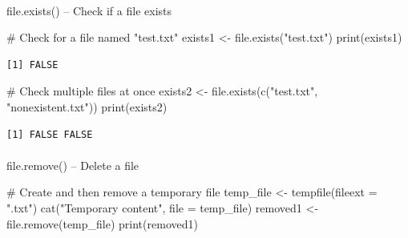 \documentclass[
  letterpaper,
  DIV=11,
  numbers=noendperiod]{scrartcl}
\makeatletter
\let\oldparagraph\paragraph
\renewcommand{\paragraph}{
    \@ifstar
      \xxxParagraphStar
      \xxxParagraphNoStar
  }
\newcommand{\xxxParagraphStar}[1]{\oldparagraph*{#1}\mbox{}}
\newcommand{\xxxParagraphNoStar}[1]{\oldparagraph{#1}\mbox{}}
\newenvironment{Shaded}{\begin{snugshade}}{\end{snugshade}}
\newcommand{\AttributeTok}[1]{\textcolor[rgb]{0.40,0.45,0.13}{#1}}
\newcommand{\CommentTok}[1]{\textcolor[rgb]{0.37,0.37,0.37}{#1}}
\newcommand{\FunctionTok}[1]{\textcolor[rgb]{0.28,0.35,0.67}{#1}}
\newcommand{\NormalTok}[1]{\textcolor[rgb]{0.00,0.23,0.31}{#1}}
\newcommand{\OtherTok}[1]{\textcolor[rgb]{0.00,0.23,0.31}{#1}}
\newcommand{\StringTok}[1]{\textcolor[rgb]{0.13,0.47,0.30}{#1}}
\makeatother
\begin{document}
\paragraph{file.exists() -- Check if a file
exists}\label{fileexists--check-if-a-file-exists}

\begin{Shaded}
\begin{Highlighting}[]
\CommentTok{\#   Check for a file named "test.txt"}
\NormalTok{exists1 }\OtherTok{\textless{}{-}} \FunctionTok{file.exists}\NormalTok{(}\StringTok{"test.txt"}\NormalTok{)}
\FunctionTok{print}\NormalTok{(exists1)}
\end{Highlighting}
\end{Shaded}

\begin{verbatim}
[1] FALSE
\end{verbatim}

\begin{Shaded}
\begin{Highlighting}[]
\CommentTok{\#   Check multiple files at once}
\NormalTok{exists2 }\OtherTok{\textless{}{-}} \FunctionTok{file.exists}\NormalTok{(}\FunctionTok{c}\NormalTok{(}\StringTok{"test.txt"}\NormalTok{, }\StringTok{"nonexistent.txt"}\NormalTok{))}
\FunctionTok{print}\NormalTok{(exists2)}
\end{Highlighting}
\end{Shaded}

\begin{verbatim}
[1] FALSE FALSE
\end{verbatim}

\paragraph{file.remove() -- Delete a
file}\label{file.remove-delete-a-file}

\begin{Shaded}
\begin{Highlighting}[]
\CommentTok{\#   Create and then remove a temporary file}
\NormalTok{temp\_file }\OtherTok{\textless{}{-}} \FunctionTok{tempfile}\NormalTok{(}\AttributeTok{fileext =} \StringTok{".txt"}\NormalTok{)}
\FunctionTok{cat}\NormalTok{(}\StringTok{"Temporary content"}\NormalTok{, }\AttributeTok{file =}\NormalTok{ temp\_file)}
\NormalTok{removed1 }\OtherTok{\textless{}{-}} \FunctionTok{file.remove}\NormalTok{(temp\_file)}
\FunctionTok{print}\NormalTok{(removed1)}
\end{Highlighting}
\end{Shaded}
\end{document}
